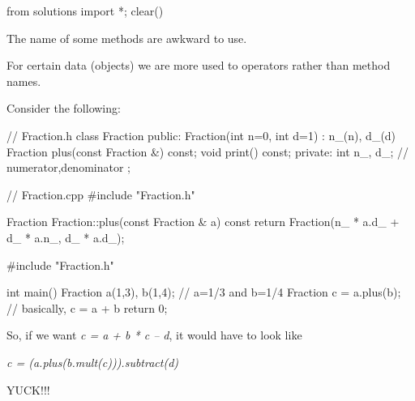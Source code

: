 \begin{python0}
from solutions import *; clear()
\end{python0}

The name of some methods are awkward to use.

For certain data (objects) we are more used to operators rather than
method names.

Consider the following:

\begin{consolethree}[escapeinside=||]
// Fraction.h
class Fraction
{
public:
    Fraction(int n=0, int d=1)
        : n_(n), d_(d)
    {}
    Fraction plus(const Fraction &) const;
    void print() const;
private:
    int n_, d_; // numerator,denominator
};
\end{consolethree}

\begin{consolethree}[escapeinside=||]
// Fraction.cpp
#include "Fraction.h"

Fraction Fraction::plus(const Fraction & a) const
{
    return Fraction(n_ * a.d_ + d_ * a.n_, d_ * a.d_);
}
\end{consolethree}

\begin{consolethree}[escapeinside=||]
#include "Fraction.h"

int main()
{
    Fraction a(1,3), b(1,4); // a=1/3 and b=1/4
    Fraction c = a.plus(b); // basically, c = a + b
    return 0;
}
\end{consolethree}

So, if we want \textit{c = a + b * c -- d}, it would have to look like

\textit{c = (a.plus(b.mult(c))).subtract(d)}

YUCK!!!


